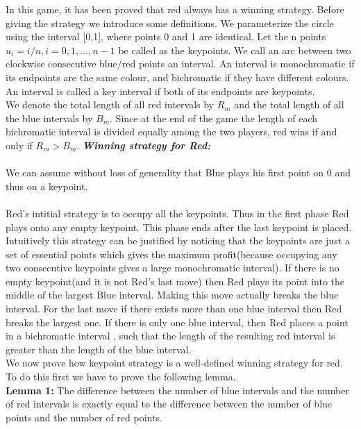 \documentclass[12pt]{article}
\begin{document}
In this game, it has been proved that red always has a winning strategy.  Before giving the strategy we introduce some definitions. 
We parameterize the circle using the interval [0,1], where points 0 and 1 are identical. Let the n points $u_i= i/n, i=0,1, ... , n-1$ be called as the keypoints. We call an arc between two clockwise consecutive blue/red points an interval. An interval is monochromatic if its endpoints are the same colour, and bichromatic if they have different colours. An interval is called a key interval if both of its endpoints are keypoints.\\

We denote the total length of all red intervals by $R_m$ and the total length of all the blue intervals by $B_m$. Since at the end of the game the length of each bichromatic interval is divided equally among the two players, red wins if and only if $R_m > B_m$.
\newpage
{\bf  \emph{Winning strategy for Red:}}\\
\\
\indent We can assume without loss of generality that Blue plays his first point on 0 and thus on a keypoint.\\
\\
\indent Red's intitial strategy is to occupy all the keypoints. Thus in the first phase Red plays onto any empty keypoint. This phase ends after the last keypoint is placed. Intuitively this strategy can be justified by noticing that the keypoints are just a set of essential points which gives the maximum profit(because occupying any two consecutive keypoints gives a large monochromatic interval). If there is no empty keypoint(and it is not Red's last move) then Red plays its point into the middle of the largest Blue interval. Making this move actually breaks the blue interval. For the last move if there exists more than one blue interval then Red breaks the largest one. If there is only one blue interval, then Red places a point in a bichromatic interval , such that the length of the resulting red interval is greater than the length of the blue interval. 
\\

We now prove how keypoint strategy is a well-defined winning strategy for red.
\\

To do this first we have to prove the following lemma.
\\


{ \bf Lemma 1:} The difference between the number of blue intervals and the number of red intervals is exactly equal to the difference between the number of blue points and the number of red points.\\
	
\end{document}
